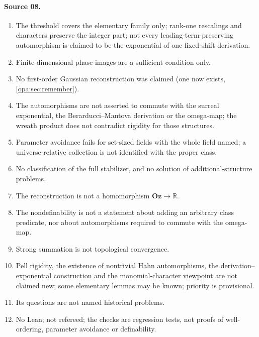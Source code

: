\documentclass[11pt,oneside]{article}
\numberwithin{equation}{section}
\theoremstyle{definition}
\theoremstyle{remark}
\newcommand{\Oz}{\mathbf{Oz}}
\newcommand{\R}{\mathbb R}
\begin{document}
\paragraph{Source 08.}
\begin{enumerate}[itemsep=1pt]
\item The threshold covers the elementary family only; rank-one rescalings and characters
preserve the integer part; not every leading-term-preserving automorphism is claimed to be
the exponential of one fixed-shift derivation.
\item Finite-dimensional phase images are a sufficient condition only.
\item No first-order Gaussian reconstruction was claimed (one now exists,
\cref{opa:sec:remember}).
\item The automorphisms are not asserted to commute with the surreal exponential, the
Berarducci--Mantova derivation or the omega-map; the wreath product does not contradict
rigidity for those structures.
\item Parameter avoidance fails for set-sized fields with the whole field named; a
universe-relative collection is not identified with the proper class.
\item No classification of the full stabilizer, and no solution of additional-structure
problems.
\item The reconstruction is not a homomorphism $\Oz\to\R$.
\item The nondefinability is not a statement about adding an arbitrary class predicate, nor
about automorphisms required to commute with the omega-map.
\item Strong summation is not topological convergence.
\item Pell rigidity, the existence of nontrivial Hahn automorphisms, the
derivation--exponential construction and the monomial-character viewpoint are not claimed
new; some elementary lemmas may be known; priority is provisional.
\item Its questions are not named historical problems.
\item No Lean; not refereed; the checks are regression tests, not proofs of well-ordering,
parameter avoidance or definability.
\end{enumerate}
\end{document}
